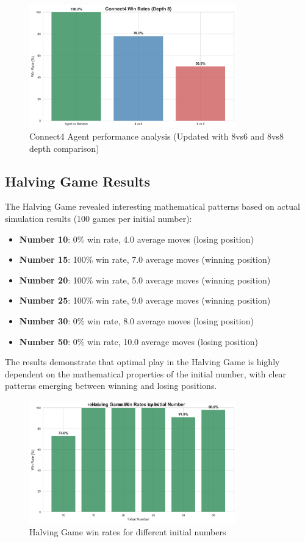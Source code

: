 \documentclass[12pt]{article}
\begin{document}
\begin{figure}[H]
\centering
\includegraphics[width=0.8\textwidth]{output/images/connect4_win_rates_updated.png}
\caption{Connect4 Agent performance analysis (Updated with 8vs6 and 8vs8 depth comparison)}
\label{fig:connect4_win_rates}
\end{figure}

\subsection{Halving Game Results}

The Halving Game revealed interesting mathematical patterns based on actual simulation results (100 games per initial number):
\begin{itemize}
    \item \textbf{Number 10}: 0\% win rate, 4.0 average moves (losing position)
    \item \textbf{Number 15}: 100\% win rate, 7.0 average moves (winning position)
    \item \textbf{Number 20}: 100\% win rate, 5.0 average moves (winning position)
    \item \textbf{Number 25}: 100\% win rate, 9.0 average moves (winning position)
    \item \textbf{Number 30}: 0\% win rate, 8.0 average moves (losing position)
    \item \textbf{Number 50}: 0\% win rate, 10.0 average moves (losing position)
\end{itemize}
The results demonstrate that optimal play in the Halving Game is highly dependent on the mathematical properties of the initial number, with clear patterns emerging between winning and losing positions.

\begin{figure}[H]
\centering
\includegraphics[width=0.8\textwidth]{output/images/halving_win_rates.png}
\caption{Halving Game win rates for different initial numbers}
\label{fig:halving_win_rates}
\end{figure}
\end{document}
